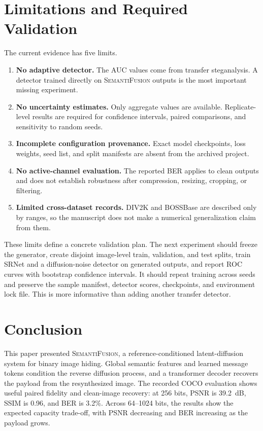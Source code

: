 \documentclass[pdflatex,sn-mathphys-num]{sn-jnl}
\newcommand{\method}{\textsc{SemantiFusion}}
\begin{document}
\section{Limitations and Required Validation}
\label{sec:limitations}

The current evidence has five limits.

\begin{enumerate}
\item \textbf{No adaptive detector.} The AUC values come from transfer steganalysis. A detector trained directly on \method{} outputs is the most important missing experiment.
\item \textbf{No uncertainty estimates.} Only aggregate values are available. Replicate-level results are required for confidence intervals, paired comparisons, and sensitivity to random seeds.
\item \textbf{Incomplete configuration provenance.} Exact model checkpoints, loss weights, seed list, and split manifests are absent from the archived project.
\item \textbf{No active-channel evaluation.} The reported BER applies to clean outputs and does not establish robustness after compression, resizing, cropping, or filtering.
\item \textbf{Limited cross-dataset records.} DIV2K and BOSSBase are described only by ranges, so the manuscript does not make a numerical generalization claim from them.
\end{enumerate}

These limits define a concrete validation plan. The next experiment should freeze the generator, create disjoint image-level train, validation, and test splits, train SRNet and a diffusion-noise detector on generated outputs, and report ROC curves with bootstrap confidence intervals. It should repeat training across seeds and preserve the sample manifest, detector scores, checkpoints, and environment lock file. This is more informative than adding another transfer detector.

\section{Conclusion}
\label{sec:conclusion}

This paper presented \method, a reference-conditioned latent-diffusion system for binary image hiding. Global semantic features and learned message tokens condition the reverse diffusion process, and a transformer decoder recovers the payload from the resynthesized image. The recorded COCO evaluation shows useful paired fidelity and clean-image recovery: at 256 bits, PSNR is 39.2~dB, SSIM is 0.96, and BER is 3.2\%. Across 64--1024 bits, the results show the expected capacity trade-off, with PSNR decreasing and BER increasing as the payload grows.
\end{document}
